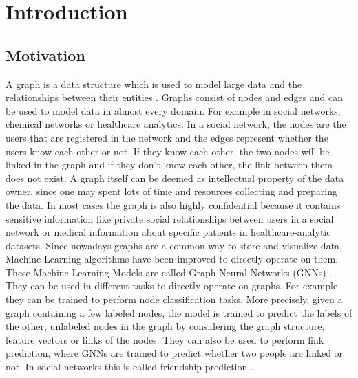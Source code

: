 \chapter{Introduction}


	\section{Motivation}

		A graph is a data structure which is used to model large data and the relationships between their entities \cite{DBLP:journals/corr/abs-2005-00687, cook2006mining}.
		Graphs consist of nodes and edges and can be used to model data in almost every domain.
		For example in social networks, chemical networks or healthcare analytics.
		In a social network, the nodes are the users that are registered in the network and the edges represent whether the users know each other or not.
		If they know each other, the two nodes will be linked in the graph and if they don't know each other, the link between them does not exist.
		A graph itself can be deemed as intellectual property of the data owner, since one may spent lots of time and resources collecting and preparing the data.
		In most cases the graph is also highly confidential because it contains sensitive information like private social relationships between users in a social network or medical information about specific patients in healthcare-analytic datasets.
		Since nowadays graphs are a common way to store and visualize data, Machine Learning algorithms have been improved to directly operate on them.
		These Machine Learning Models are called Graph Neural Networks (GNNs) \cite{atwood2016diffusionconvolutional, defferrard2017convolutional}.
		They can be used in different tasks to directly operate on graphs.
		For example they can be trained to perform node classification tasks\cite{kipf2017semisupervised}.
		More precisely, given a graph containing a few labeled nodes, the model is trained to predict the labels of the other, unlabeled nodes in the graph by considering the graph structure, feature vectors or links of the nodes.
		They can also be used to perform link prediction, where GNNs are trained to predict whether two people are linked or not.
		In social networks this is called friendship prediction \cite{zhang2018link}.

